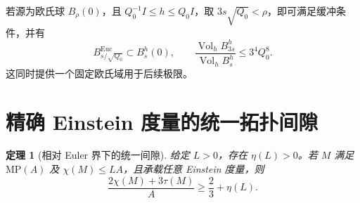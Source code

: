 \documentclass[UTF8,fontset=fandol,zihao=-4]{ctexart}
\theoremstyle{cn}
\newtheorem{theorem}{定理}[section]
\DeclareMathOperator{\Vol}{Vol}
\numberwithin{equation}{section}
\begin{document}
若源为欧氏球 $B_\rho(0)$，且 $Q_0^{-1}I\le h\le Q_0I$，取 $3s\sqrt{Q_0}<\rho$，即可满足缓冲条件，并有
\[
B^{\mathrm{Euc}}_{s/\sqrt{Q_0}}\subset B_s^h(0),\qquad
\frac{\Vol_hB_{3s}^h}{\Vol_hB_s^h}\le3^4Q_0^8.
\]
这同时提供一个固定欧氏域用于后续极限。

\section{精确 Einstein 度量的统一拓扑间隙}

\begin{theorem}[相对 Euler 界下的统一间隙]\label{thm:exact}
给定 $L>0$，存在 $\eta(L)>0$。若 $M$ 满足 $\mathrm{MP}(A)$ 及 $\chi(M)\le LA$，且承载任意 Einstein 度量，则
\begin{equation}\label{eq:exact-gap}
\frac{2\chi(M)+3\tau(M)}A\ge\frac23+\eta(L).
\end{equation}
\end{theorem}
\end{document}
